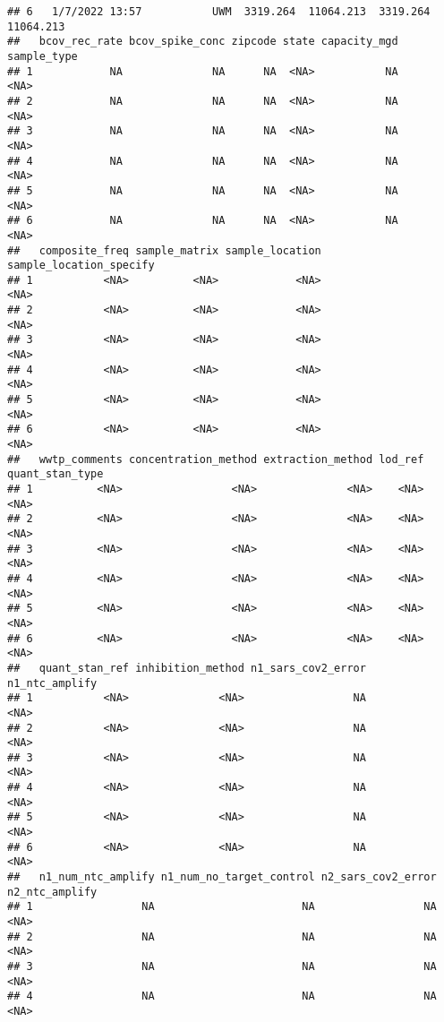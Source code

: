 \documentclass[
]{article}
\begin{document}
\begin{verbatim}
## 6   1/7/2022 13:57           UWM  3319.264  11064.213  3319.264  11064.213
##   bcov_rec_rate bcov_spike_conc zipcode state capacity_mgd sample_type
## 1            NA              NA      NA  <NA>           NA        <NA>
## 2            NA              NA      NA  <NA>           NA        <NA>
## 3            NA              NA      NA  <NA>           NA        <NA>
## 4            NA              NA      NA  <NA>           NA        <NA>
## 5            NA              NA      NA  <NA>           NA        <NA>
## 6            NA              NA      NA  <NA>           NA        <NA>
##   composite_freq sample_matrix sample_location sample_location_specify
## 1           <NA>          <NA>            <NA>                    <NA>
## 2           <NA>          <NA>            <NA>                    <NA>
## 3           <NA>          <NA>            <NA>                    <NA>
## 4           <NA>          <NA>            <NA>                    <NA>
## 5           <NA>          <NA>            <NA>                    <NA>
## 6           <NA>          <NA>            <NA>                    <NA>
##   wwtp_comments concentration_method extraction_method lod_ref quant_stan_type
## 1          <NA>                 <NA>              <NA>    <NA>            <NA>
## 2          <NA>                 <NA>              <NA>    <NA>            <NA>
## 3          <NA>                 <NA>              <NA>    <NA>            <NA>
## 4          <NA>                 <NA>              <NA>    <NA>            <NA>
## 5          <NA>                 <NA>              <NA>    <NA>            <NA>
## 6          <NA>                 <NA>              <NA>    <NA>            <NA>
##   quant_stan_ref inhibition_method n1_sars_cov2_error n1_ntc_amplify
## 1           <NA>              <NA>                 NA           <NA>
## 2           <NA>              <NA>                 NA           <NA>
## 3           <NA>              <NA>                 NA           <NA>
## 4           <NA>              <NA>                 NA           <NA>
## 5           <NA>              <NA>                 NA           <NA>
## 6           <NA>              <NA>                 NA           <NA>
##   n1_num_ntc_amplify n1_num_no_target_control n2_sars_cov2_error n2_ntc_amplify
## 1                 NA                       NA                 NA           <NA>
## 2                 NA                       NA                 NA           <NA>
## 3                 NA                       NA                 NA           <NA>
## 4                 NA                       NA                 NA           <NA>

\end{verbatim}
\end{document}
